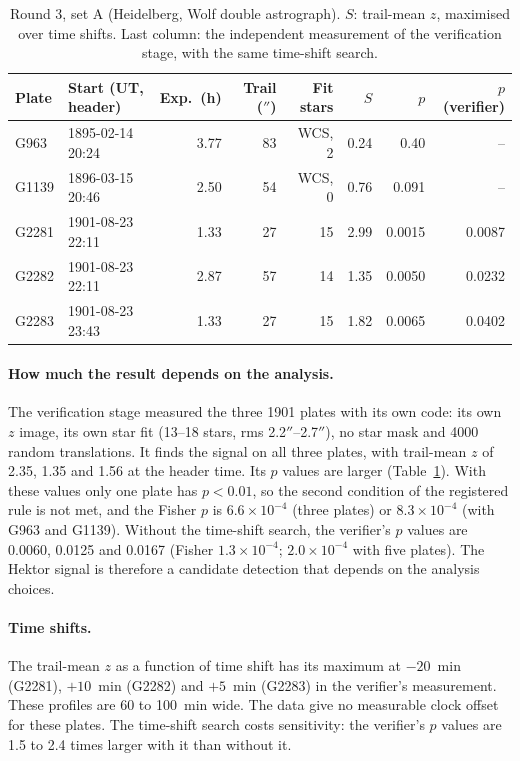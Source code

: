 \documentclass[11pt]{article}
\newcommand{\as}{$''$}
\begin{document}
\begin{table}[h]
\centering\small
\begin{tabular}{llrrrrrr}\toprule
Plate & Start (UT, header) & Exp.\ (h) & Trail (\as) & Fit stars & $S$ & $p$ & $p$ (verifier) \\\midrule
G963 & 1895-02-14 20:24 & 3.77 & 83 & WCS, 2 & 0.24 & 0.40 & -- \\
G1139 & 1896-03-15 20:46 & 2.50 & 54 & WCS, 0 & 0.76 & 0.091 & -- \\
G2281 & 1901-08-23 22:11 & 1.33 & 27 & 15 & 2.99 & 0.0015 & 0.0087 \\
G2282 & 1901-08-23 22:11 & 2.87 & 57 & 14 & 1.35 & 0.0050 & 0.0232 \\
G2283 & 1901-08-23 23:43 & 1.33 & 27 & 15 & 1.82 & 0.0065 & 0.0402 \\\bottomrule
\end{tabular}
\caption{Round 3, set A (Heidelberg, Wolf double astrograph). $S$: trail-mean $z$, maximised over time shifts. Last column: the independent measurement of the verification stage, with the same time-shift search.}
\label{tab:hdap}
\end{table}

\paragraph{How much the result depends on the analysis.} The verification stage measured the three 1901 plates with its own code: its own $z$ image, its own star fit (13--18 stars, rms 2.2\as--2.7\as), no star mask and 4000 random translations. It finds the signal on all three plates, with trail-mean $z$ of 2.35, 1.35 and 1.56 at the header time. Its $p$ values are larger (Table~\ref{tab:hdap}). With these values only one plate has $p<0.01$, so the second condition of the registered rule is not met, and the Fisher $p$ is $6.6\times10^{-4}$ (three plates) or $8.3\times10^{-4}$ (with G963 and G1139). Without the time-shift search, the verifier's $p$ values are 0.0060, 0.0125 and 0.0167 (Fisher $1.3\times10^{-4}$; $2.0\times10^{-4}$ with five plates). The Hektor signal is therefore a candidate detection that depends on the analysis choices.

\paragraph{Time shifts.} The trail-mean $z$ as a function of time shift has its maximum at $-20$~min (G2281), $+10$~min (G2282) and $+5$~min (G2283) in the verifier's measurement. These profiles are 60 to 100~min wide. The data give no measurable clock offset for these plates. The time-shift search costs sensitivity: the verifier's $p$ values are 1.5 to 2.4 times larger with it than without it.
\end{document}
